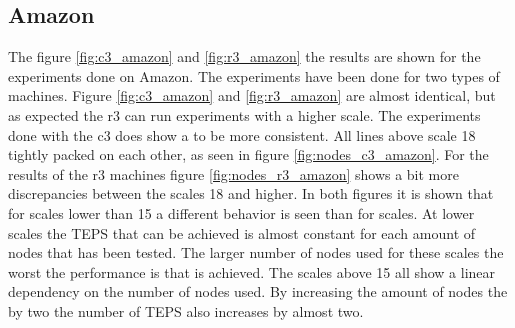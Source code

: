 \subsection{Amazon}
\label{res:amazon}
The figure \ref{fig:c3_amazon} and \ref{fig:r3_amazon} the results are shown for the experiments done on Amazon. The experiments have been done for two types of machines. Figure \ref{fig:c3_amazon} and \ref{fig:r3_amazon} are almost identical, but as expected the r3 can run experiments with a higher scale. The experiments done with the c3 does show a to be more consistent. All lines above scale 18 tightly packed on each other, as seen in figure \ref{fig:nodes_c3_amazon}. For the results of the r3 machines figure \ref{fig:nodes_r3_amazon} shows a bit more discrepancies between the scales 18 and higher. In both figures it is shown that for scales lower than 15 a different behavior is seen than for scales. At lower scales the TEPS that can be achieved is almost constant for each amount of nodes that has been tested. The larger number of nodes used for these scales the worst the performance is that is achieved. The scales above 15 all show a linear dependency on the number of nodes used. By increasing the amount of nodes the by two the number of TEPS also increases by almost two.

